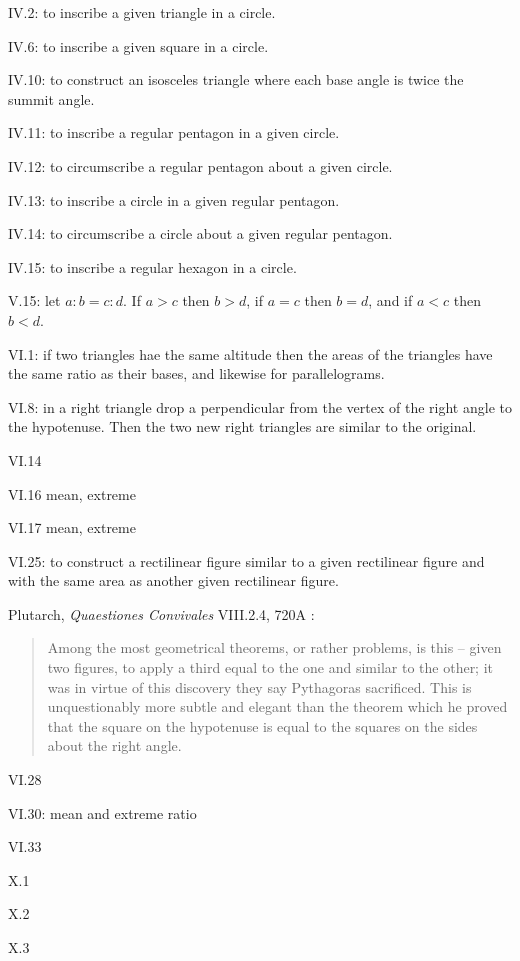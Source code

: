 \documentclass{amsart}
\theoremstyle{definition}
\begin{document}
IV.2: to inscribe a given triangle in a circle.

IV.6: to inscribe a given square in a circle.

IV.10: to construct an isosceles triangle where each base angle is twice the summit angle.

IV.11: to inscribe a regular pentagon in a given circle.

IV.12: to circumscribe a regular pentagon about a given circle.

IV.13: to inscribe a circle in a given regular pentagon.

IV.14: to circumscribe a circle about a given regular pentagon.

IV.15: to inscribe a regular hexagon in a circle.

V.15: let $a:b=c:d$. If $a>c$ then $b>d$, if $a=c$ then $b=d$, and if $a<c$ then $b<d$. 

VI.1: if two triangles hae the same altitude then the areas of the triangles have the same ratio as their bases, and likewise for parallelograms.

VI.8: in a right triangle drop a perpendicular from the vertex of the right angle to the hypotenuse. Then the two new right triangles are similar
to the original.

VI.14

VI.16 mean, extreme 

VI.17 mean, extreme

VI.25: to construct a rectilinear figure similar to a given rectilinear figure and with the same area as another given rectilinear
figure.

Plutarch, {\em Quaestiones Convivales} VIII.2.4, 720A \cite[p.~177]{thomasI}:

\begin{quote}
Among the most geometrical theorems, or rather
problems, is this -- given two figures, to apply a third
equal to the one and similar to the other; it was
in virtue of this discovery they say Pythagoras
sacrificed. This is unquestionably more subtle and
elegant than the theorem which he proved that the
square on the hypotenuse is equal to the squares on
the sides about the right angle.
\end{quote}

VI.28

VI.30: mean and extreme ratio

VI.33

X.1

X.2

X.3
\end{document}
